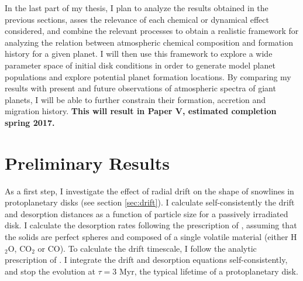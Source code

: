 \documentclass[manuscript]{aastex}
\begin{document}
In the last part of my thesis, I plan to analyze the results obtained in the previous sections, asses the relevance of each chemical or dynamical effect considered, and combine the relevant processes to obtain a realistic framework for analyzing the relation between atmospheric chemical composition and  formation history for a given planet. I will then use this framework to explore a wide parameter space of initial disk conditions in order to generate model planet populations and explore potential planet formation locations. By comparing my results with present and future observations of atmospheric spectra of giant planets, I will be able to further constrain their formation, accretion and migration history. \textbf{This will result in Paper V, estimated completion spring 2017.}

\section{Preliminary Results}

As a first step, I investigate the effect of radial drift on the shape of snowlines in protoplanetary disks (see section \ref{sec:drift}). I calculate self-consistently the drift and desorption distances as a function of particle size for a passively irradiated disk. I calculate the desorption rates following the prescription of \citet{hollenbach09}, assuming that the solids are perfect spheres and composed of a single volatile material (either H$_2$O, CO$_2$ or CO). To calculate the drift timescale, I follow the analytic prescription of \citet{chiang10}. I integrate the drift and desorption equations self-consistently, and stop the evolution at $\tau=3$ Myr, the typical lifetime of a protoplanetary disk. 
\end{document}
